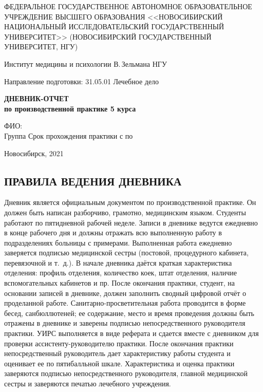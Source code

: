 \documentclass[a4paper,14pt]{extarticle}
\begin{document}
\begin{titlepage}
	\centering
	{\par\small{ФЕДЕРАЛЬНОЕ ГОСУДАРСТВЕННОЕ АВТОНОМНОЕ ОБРАЗОВАТЕЛЬНОЕ УЧРЕЖДЕНИЕ ВЫСШЕГО ОБРАЗОВАНИЯ <<НОВОСИБИРСКИЙ НАЦИОНАЛЬНЫЙ ИССЛЕДОВАТЕЛЬСКИЙ ГОСУДАРСТВЕННЫЙ УНИВЕРСИТЕТ>> (НОВОСИБИРСКИЙ ГОСУДАРСТВЕННЫЙ УНИВЕРСИТЕТ, НГУ)}}
	{\par\small{Институт медицины и психологии В.\,Зельмана НГУ}}
	{\par\small{Направление подготовки: 31.05.01 Лечебное дело}}

	\vspace{5cm}

	{\par\Large\textbf{ДНЕВНИК-ОТЧЕТ\\по производственной практике 5 курса}}

	\vspace{0.5cm}

	ФИО: \hrulefill\\
	Группа \hrulefill Срок прохождения практики с \hrulefill по \hrulefill

	\vfill

	{\centering\small{Новосибирск, 2021}}
\end{titlepage}

\newpage

\subsection*{ПРАВИЛА ВЕДЕНИЯ ДНЕВНИКА}

Дневник является официальным документом по производственной практике. 
Он должен быть написан разборчиво, грамотно, медицинским языком.
Студенты работают по пятидневной рабочей неделе.
Записи в дневнике ведутся ежедневно в конце рабочего дня и должны отражать всю 
выполненную работу в подразделениях больницы с примерами.
Выполненная работа ежедневно заверяется подписью медицинской сестры (постовой, процедурного кабинета, перевязочной и т.~д.).
В начале дневника даётся краткая характеристика отделения: профиль отделения, количество коек, штат отделения, наличие вспомогательных кабинетов и пр.
После окончания практики, студент, на основании записей в дневнике, должен заполнить сводный цифровой отчёт о проделанной работе.
Санитарно\hyp{}просветительная работа проводится в форме бесед, санбюллютеней;
ее содержание, место и время проведения должны быть отражены в дневнике и заверены подписью непосредственного руководителя практики.
УИРС выполняется в виде реферата и сдается вместе с дневником для проверки ассистенту\hyp{}руководителю практики.
После окончания практики непосредственный руководитель дает характеристику работы студента и оценивает ее по пятибалльной шкале. 
Характеристика и оценка практики заверяются подписью непосредственного руководителя, главной медицинской сестры и заверяются печатью лечебного учреждения.
\end{document}

